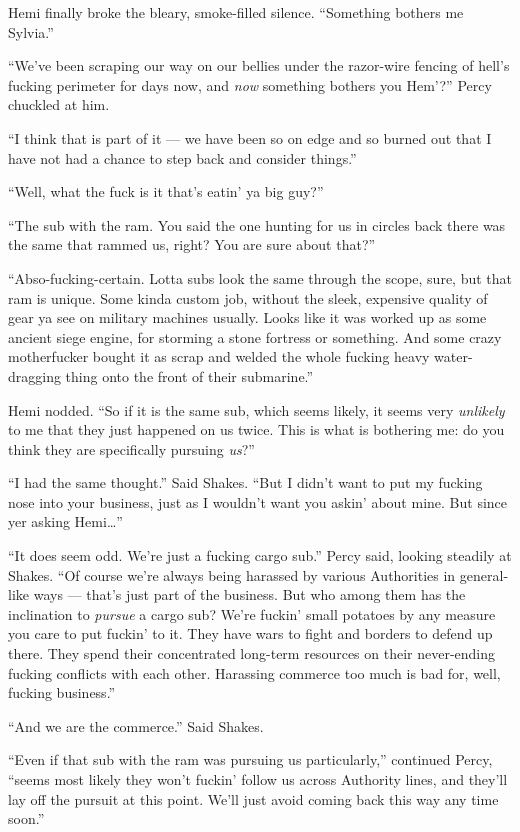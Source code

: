 \documentclass[
]{scrbook}
\begin{document}
Hemi finally broke the bleary, smoke-filled silence. ``Something bothers
me Sylvia.''

``We've been scraping our way on our bellies under the razor-wire
fencing of hell's fucking perimeter for days now, and \emph{now}
something bothers you Hem'?'' Percy chuckled at him.

``I think that is part of it --- we have been so on edge and so burned
out that I have not had a chance to step back and consider things.''

``Well, what the fuck is it that's eatin' ya big guy?''

``The sub with the ram. You said the one hunting for us in circles back
there was the same that rammed us, right? You are sure about that?''

``Abso-fucking-certain. Lotta subs look the same through the scope,
sure, but that ram is unique. Some kinda custom job, without the sleek,
expensive quality of gear ya see on military machines usually. Looks
like it was worked up as some ancient siege engine, for storming a stone
fortress or something. And some crazy motherfucker bought it as scrap
and welded the whole fucking heavy water-dragging thing onto the front
of their submarine.''

Hemi nodded. ``So if it is the same sub, which seems likely, it seems
very \emph{unlikely} to me that they just happened on us twice. This is
what is bothering me: do you think they are specifically pursuing
\emph{us}?''

``I had the same thought.'' Said Shakes. ``But I didn't want to put my
fucking nose into your business, just as I wouldn't want you askin'
about mine. But since yer asking Hemi\ldots{}''

``It does seem odd. We're just a fucking cargo sub.'' Percy said,
looking steadily at Shakes. ``Of course we're always being harassed by
various Authorities in general-like ways --- that's just part of the
business. But who among them has the inclination to \emph{pursue} a
cargo sub? We're fuckin' small potatoes by any measure you care to put
fuckin' to it. They have wars to fight and borders to defend up there.
They spend their concentrated long-term resources on their never-ending
fucking conflicts with each other. Harassing commerce too much is bad
for, well, fucking business.''

``And we are the commerce.'' Said Shakes.

``Even if that sub with the ram was pursuing us particularly,''
continued Percy, ``seems most likely they won't fuckin' follow us across
Authority lines, and they'll lay off the pursuit at this point. We'll
just avoid coming back this way any time soon.''
\end{document}

